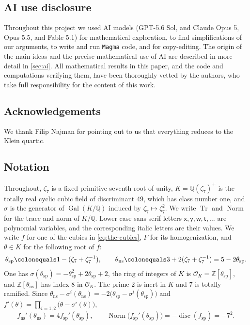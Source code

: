 \documentclass[12pt]{amsart}
\newcommand{\Q}{\mathbb{Q}}
\newcommand{\Z}{\mathbb{Z}}
\newcommand{\OO}{{\mathcal O}}
\newcommand{\x}{\mathsf{x}}
\newcommand{\y}{\mathsf{y}}
\newcommand{\w}{\mathsf{w}}
\renewcommand{\t}{\mathsf{t}}
\DeclareMathOperator{\ns}{ns}
\DeclareMathOperator{\spc}{sp}
\DeclareMathOperator{\disc}{disc}
\DeclareMathOperator{\Gal}{Gal}
\DeclareMathOperator{\Norm}{Norm}
\DeclareMathOperator{\Tr}{Tr}
\newcommand{\Magma}{\texttt{Magma}\xspace}
\numberwithin{equation}{section}
\theoremstyle{definition}
\begin{document}
\subsection*{AI use disclosure}
Throughout this project we used AI models (GPT-5.6 Sol, and Claude Opus 5, Opus
5.5, and Fable 5.1) for mathematical exploration, to find simplifications of
our arguments, to write and run \Magma{} code, and for copy-editing. The origin
of the main ideas and the precise mathematical use of AI are described in more
detail in \cref{sec:ai}. All mathematical results in this paper, and the code
and computations verifying them, have been thoroughly vetted by the authors,
who take full responsibility for the content of this work.

\subsection*{Acknowledgements}
We thank Filip Najman for pointing out to us that everything reduces to the
Klein quartic.

\subsection*{Notation}
Throughout, $\zeta_7$ is a fixed primitive seventh root of unity,
$K = \Q(\zeta_7)^{+}$ is the totally real cyclic cubic field of discriminant
$49$, which has class number one, and $\sigma$ is the generator of $\Gal(K/\Q)$
induced by $\zeta_7 \mapsto \zeta_7^{2}$. We write $\Tr$ and $\Norm$ for the trace and norm
of $K/\Q$. Lower-case sans-serif letters $\x,\y,\w,\t,\dots$ are polynomial
variables, and the corresponding italic letters are their values. We write $f$
for one of the cubics in \cref{eq:the-cubics}, $F$ for its homogenization, and
$\theta \in K$ for the following root of $f$:
\begin{equation}
  \label{eq:thetas}
  \theta_{\spc} \colonequals 1 - (\zeta_7 + \zeta_7^{-1}),
  \qquad
  \theta_{\ns} \colonequals 3 + 2(\zeta_7 + \zeta_7^{-1}) = 5 - 2\theta_{\spc} .
\end{equation}
One has $\sigma(\theta_{\spc}) = -\theta_{\spc}^2 + 2\theta_{\spc} + 2$, the ring
of integers of $K$ is $\OO_K = \Z[\theta_{\spc}]$, and $\Z[\theta_{\ns}]$ has
index $8$ in $\OO_K$. The prime $2$ is inert in $K$ and $7$ is totally ramified.
Since $\theta_{\ns} - \sigma^{i}(\theta_{\ns}) = -2\bigl(\theta_{\spc} -
\sigma^{i}(\theta_{\spc})\bigr)$ and $f'(\theta) = \prod_{i=1,2}\bigl(\theta -
\sigma^{i}(\theta)\bigr)$,
\begin{equation}
  \label{eq:fprime}
  f_{\ns}'(\theta_{\ns}) = 4f_{\spc}'(\theta_{\spc}),
  \qquad
  \Norm\bigl(f_{\spc}'(\theta_{\spc})\bigr) = -\disc(f_{\spc}) = -7^{2} .
\end{equation}
\end{document}
